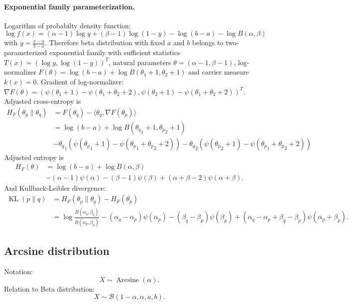 \documentclass[a4paper,11pt]{article}
\theoremstyle{plain}
\theoremstyle{definition}
\begin{document}
	\paragraph{Exponential family parameterization.}
	Logarithm of probabilty density function:
	\[ \log f(x) = (\alpha - 1) \log y  + (\beta-1) \log(1-y) - \log(b-a) - \log B(\alpha, \beta) \]
	with $y=\frac{x-a}{b-a}$. Therefore beta distribution with fixed $a$ and $b$ belongs to two-parameterized exponential family with sufficient statistics $T(x) = (\log y, \log(1-y) )^T$, natural parameters $\theta = (\alpha-1, \beta-1)$, log-normalizer $F(\theta) = \log(b-a) + \log B(\theta_1 + 1, \theta_2 + 1)$ and carrier measure $k(x)=0$. Gradient of log-normalizer: $\nabla F(\theta) = (\psi(\theta_1+1)-\psi(\theta_1+\theta_2+2), \psi(\theta_2+1)-\psi(\theta_1+\theta_2+2))^T $. Adjusted cross-entropy is
	\[ 
	\begin{aligned}
	H_F(\theta_p \| \theta_q) & = F(\theta_q) - \langle \theta_q, \nabla F(\theta_p) \rangle \\
	& = \log(b-a) + \log B({\theta_q}_1 + 1, {\theta_p}_2 + 1) \\ & -  {\theta_q}_1(\psi({\theta_p}_1+1)-\psi({\theta_p}_1+{\theta_p}_2+2)) - {\theta_q}_2 (\psi({\theta_p}_2+1)-\psi({\theta_p}_1+{\theta_p}_2+2))
	\end{aligned}
	\]
	Adjusted entropy is
	\[
	\begin{aligned}
	H_F(\theta) & = \log(b-a)+ \log B(\alpha, \beta) \\
	& - (\alpha-1) \psi(\alpha) - (\beta-1)\psi(\beta) + (\alpha+\beta-2)\psi(\alpha+\beta).
	\end{aligned}
	\]
	And Kullback-Leibler divergence:
	\[
	\begin{aligned}
	\operatorname{KL}(p \| q) & = H_F(\theta_p \| \theta_q) - H_F(\theta_p) \\
	& = \log \frac{B(\alpha_q, \beta_q)}{B(\alpha_p, \beta_p)} - (\alpha_q - \alpha_p) \psi(\alpha_p) - (\beta_q - \beta_p)\psi(\beta_p) + (\alpha_q - \alpha_p + \beta_q - \beta_p) \psi(\alpha_p+\beta_p).
	\end{aligned}
	\]
	
	\subsection{Arcsine distribution}
	Notation:
	\[
	X \sim \operatorname{Arcsine}(\alpha).
	\]
	Relation to Beta distribution: \[ X \sim \mathcal{B}(1-\alpha, \alpha, a, b). \]
\end{document}
